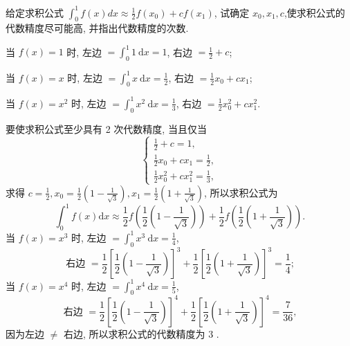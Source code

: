 \begin{tcolorbox}[breakable,
		colframe=white!10!jingga, coltitle=white!90!jingga, colback=white!95!jingga, coltext=black, colbacktitle=white!10!jingga, enhanced, fonttitle=\bfseries,fontupper=\normalsize, attach boxed title to top left={yshift=-2mm}, before skip=8pt, after skip=8pt,
		title=解答题]

 给定求积公式 $ \displaystyle\int_{0}^{1} f(x) d x \approx \frac{1}{2} f\left(x_{0}\right)+c f\left(x_{1}\right) $, 试确定 $ x_{0}, x_{1}, c $,使求积公式的代数精度尽可能高, 并指出代数精度的次数.

 \tcblower
  当 $ f(x)=1 $ 时, 左边 $ =\int_{0}^{1} 1 \mathrm{~d} x=1 $, 右边 $ =\frac{1}{2}+c $;
  
  当 $ f(x)=x $ 时, 左边 $ =\int_{0}^{1} x \mathrm{~d} x=\frac{1}{2} $, 右边 $ =\frac{1}{2} x_{0}+c x_{1} $;
  
  当 $ f(x)=x^{2} $ 时, 左边 $ =\int_{0}^{1} x^{2} \mathrm{~d} x=\frac{1}{3} $, 右边 $ =\frac{1}{2} x_{0}^{2}+c x_{1}^{2} $.
  
  要使求积公式至少具有 2 次代数精度, 当且仅当
$$
\left\{\begin{array}{l}
\frac{1}{2}+c=1, \\
\frac{1}{2} x_{0}+c x_{1}=\frac{1}{2}, \\
\frac{1}{2} x_{0}^{2}+c x_{1}^{2}=\frac{1}{3},
\end{array}\right.
$$
求得 $ c=\frac{1}{2}, x_{0}=\frac{1}{2}\left(1-\frac{1}{\sqrt{3}}\right), x_{1}=\frac{1}{2}\left(1+\frac{1}{\sqrt{3}}\right) $, 所以求积公式为
$$
\int_{0}^{1} f(x) \mathrm{d} x \approx \frac{1}{2} f\left(\frac{1}{2}\left(1-\frac{1}{\sqrt{3}}\right)\right)+\frac{1}{2} f\left(\frac{1}{2}\left(1+\frac{1}{\sqrt{3}}\right)\right) .
$$
当 $ f(x)=x^{3} $ 时, 左边 $ =\int_{0}^{1} x^{3} \mathrm{~d} x=\frac{1}{4} $,
$$
\text { 右边 }=\frac{1}{2}\left[\frac{1}{2}\left(1-\frac{1}{\sqrt{3}}\right)\right]^{3}+\frac{1}{2}\left[\frac{1}{2}\left(1+\frac{1}{\sqrt{3}}\right)\right]^{3}=\frac{1}{4} \text {; }
$$
当 $ f(x)=x^{4} $ 时, 左边 $ =\int_{0}^{1} x^{4} \mathrm{~d} x=\frac{1}{5} $,
$$
\text { 右边 }=\frac{1}{2}\left[\frac{1}{2}\left(1-\frac{1}{\sqrt{3}}\right)\right]^{4}+\frac{1}{2}\left[\frac{1}{2}\left(1+\frac{1}{\sqrt{3}}\right)\right]^{4}=\frac{7}{36} \text {, }
$$
因为左边 $ \neq $ 右边, 所以求积公式的代数精度为 3 .
\end{tcolorbox}



